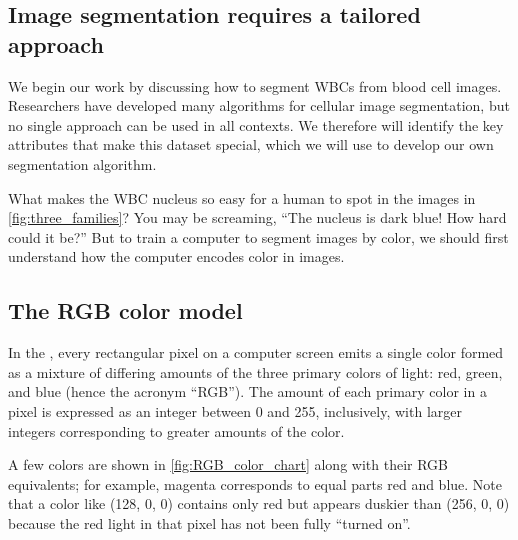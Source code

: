 \subsection{Image segmentation requires a tailored approach}

We begin our work by discussing how to segment WBCs from blood cell images. Researchers have developed many algorithms for cellular image segmentation, but no single approach can be used in all contexts. We therefore will identify the key attributes that make this dataset special, which we will use to develop our own segmentation algorithm.

What makes the WBC nucleus so easy for a human to spot in the images in \autoref{fig:three_families}? You may be screaming, ``The nucleus is dark blue! How hard could it be?'' But to train a computer to segment images by color, we should first understand how the computer encodes color in images.

\FloatBarrier
{}
\subsection{The RGB color model}

In the , every rectangular pixel on a computer screen emits a single color formed as a mixture of differing amounts of the three primary colors of light: red, green, and blue (hence the acronym ``RGB''). The amount of each primary color in a pixel is expressed as an integer between 0 and 255, inclusively, with larger integers corresponding to greater amounts of the color.

A few colors are shown in \autoref{fig:RGB_color_chart} along with their RGB equivalents; for example, magenta corresponds to equal parts red and blue. Note that a color like (128, 0, 0) contains only red but appears duskier than (256, 0, 0) because the red light in that pixel has not been fully “turned on”.\\

